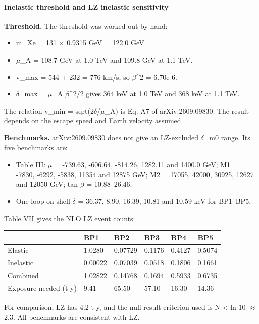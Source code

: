 \documentclass[11pt,a4paper]{article}
\begin{document}
\paragraph{Inelastic threshold and LZ inelastic sensitivity}
\textbf{Threshold.} The threshold was worked out by hand:

\begin{itemize}
  \item m\_Xe = 131 $\times$ 0.9315 GeV = 122.0 GeV.
  \item $\mu$\_A = 108.7 GeV at 1.0 TeV and 109.8 GeV at 1.1 TeV.
  \item v\_max = 544 + 232 = 776 km/s, so $\beta$\textasciicircum{}2 = 6.70e-6.
  \item $\delta$\_max = $\mu$\_A $\beta$\textasciicircum{}2/2 gives 364 keV at 1.0 TeV and 368 keV at 1.1 TeV.
\end{itemize}
The relation v\_min = sqrt(2$\delta$/$\mu$\_A) is Eq. A7 of arXiv:2609.09830. The result depends on the escape speed and Earth velocity assumed.

\textbf{Benchmarks.} arXiv:2609.09830 does not give an LZ-excluded $\delta$\_m0 range. Its five benchmarks are:

\begin{itemize}
  \item Table III: $\mu$ = -739.63, -606.64, -814.26, 1282.11 and 1400.0 GeV; M1 = -7830, -6292, -5838, 11354 and 12875 GeV; M2 = 17055, 42000, 30925, 12627 and 12050 GeV; tan $\beta$ = 10.88--26.46.
  \item One-loop on-shell $\delta$ = 36.37, 8.90, 16.39, 10.81 and 10.59 keV for BP1--BP5.
\end{itemize}
Table VII gives the NLO LZ event counts:

\begin{longtable}{@{}p{}p{}p{}p{}p{}p{}@{}}
\toprule
\textbf{} & \textbf{BP1} & \textbf{BP2} & \textbf{BP3} & \textbf{BP4} & \textbf{BP5} \\ \midrule \endhead
Elastic & 1.0280 & 0.07729 & 0.1176 & 0.4127 & 0.5074 \\
Inelastic & 0.00022 & 0.07039 & 0.0518 & 0.1806 & 0.1661 \\
Combined & 1.02822 & 0.14768 & 0.1694 & 0.5933 & 0.6735 \\
Exposure needed (t-y) & 9.41 & 65.50 & 57.10 & 16.30 & 14.36 \\
\bottomrule\end{longtable}
For comparison, LZ has 4.2 t-y, and the null-result criterion used is N \textless{} ln 10 $\approx$ 2.3. All benchmarks are consistent with LZ.
\end{document}
